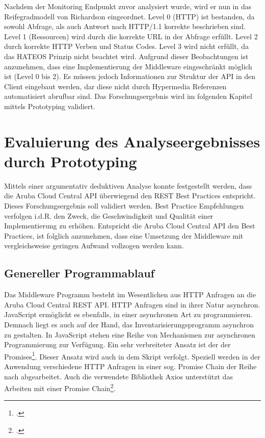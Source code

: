 Nachdem der Monitoring Endpunkt zuvor analysiert wurde, wird er nun in das Reifegradmodell von Richardson eingeordnet. Level 0 (HTTP) ist bestanden, da sowohl Abfrage, als auch Antwort nach HTTP/1.1 korrekte beschrieben sind. Level 1 (Ressourcen) wird durch die korrekte URL in der Abfrage erfüllt. Level 2 durch korrekte HTTP Verben und Status Codes. Level 3 wird nicht erfüllt, da das HATEOS Prinzip nicht beachtet wird. Aufgrund dieser Beobachtungen ist anzunehmen, dass eine Implementierung der Middleware eingeschränkt möglich ist (Level 0 bis 2). Es müssen jedoch Informationen zur Struktur der API in den Client eingebaut werden, dar diese nicht durch Hypermedia Referenzen automatisiert abrufbar sind. Das Forschungsergebnis wird im folgenden Kapitel mittels Prototyping validiert.

\section{Evaluierung des Analyseergebnisses durch Prototyping}\label{section:Evaluierung-des-Analyseergebnisses-durch-Prototyping}

Mittels einer argumentativ deduktiven Analyse konnte festgestellt werden, dass die Aruba Cloud Central API überwiegend den REST Best Practices entspricht. Dieses Forschungsergebnis soll validiert werden. Best Practice Empfehlungen verfolgen i.d.R. den Zweck, die Geschwindigkeit und Qualität einer Implementierung zu erhöhen. Entspricht die Aruba Cloud Central API den Best Practices, ist folglich anzunehmen, dass eine Umsetzung der Middleware mit vergleichsweise geringen Aufwand vollzogen werden kann.

\subsection{Genereller Programmablauf}\label{subsection:genereller-programmablauf}

Das Middleware Programm besteht im Wesentlichen aus HTTP Anfragen an die Aruba Cloud Central REST API. HTTP Anfragen sind in ihrer Natur asynchron. JavaScript ermöglicht es ebenfalls, in einer asynchronen Art zu programmieren. Demnach liegt es auch auf der Hand, das Inventarisierungsprogramm asynchron zu gestalten. In JavaScript stehen eine Reihe von Mechanismen zur asynchronen Programmierung zur Verfügung. Ein sehr verbreiteter Ansatz ist der der Promises\footcite[S. 11]{parker_javascript_2015}. Dieser Ansatz wird auch in dem Skript verfolgt. Speziell werden in der Anwendung verschiedene HTTP Anfragen in einer sog. Promise Chain der Reihe nach abgearbeitet. Auch die verwendete Bibliothek Axios unterstützt das Arbeiten mit einer Promise Chain\footcite{zabriskie_axios_2021}. 

